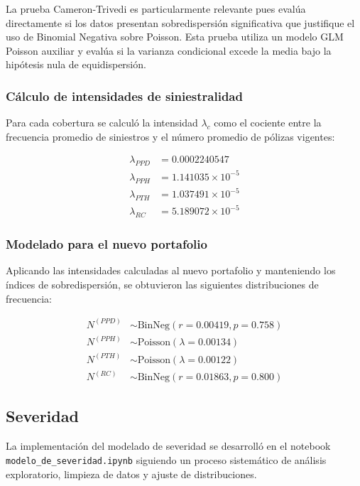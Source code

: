 La prueba Cameron-Trivedi es particularmente relevante pues evalúa directamente si los datos presentan sobredispersión significativa que justifique el uso de Binomial Negativa sobre Poisson. Esta prueba utiliza un modelo GLM Poisson auxiliar y evalúa si la varianza condicional excede la media bajo la hipótesis nula de equidispersión.

\subsubsection{Cálculo de intensidades de siniestralidad}

Para cada cobertura se calculó la intensidad $\lambda_c$ como el cociente entre la frecuencia promedio de siniestros y el número promedio de pólizas vigentes:

\begin{align}
\lambda_{PPD} &= 0.0002240547\\
\lambda_{PPH} &= 1.141035 \times 10^{-5}\\
\lambda_{PTH} &= 1.037491 \times 10^{-5}\\
\lambda_{RC} &= 5.189072 \times 10^{-5}
\end{align}

\subsubsection{Modelado para el nuevo portafolio}

Aplicando las intensidades calculadas al nuevo portafolio y manteniendo los índices de sobredispersión, se obtuvieron las siguientes distribuciones de frecuencia:

\begin{align}
N^{(PPD)} &\sim \text{BinNeg}(r = 0.00419, p = 0.758)\\
N^{(PPH)} &\sim \text{Poisson}(\lambda = 0.00134)\\
N^{(PTH)} &\sim \text{Poisson}(\lambda = 0.00122)\\
N^{(RC)} &\sim \text{BinNeg}(r = 0.01863, p = 0.800)
\end{align}

\subsection{Severidad}

La implementación del modelado de severidad se desarrolló en el notebook \texttt{modelo\_de\_severidad.ipynb} siguiendo un proceso sistemático de análisis exploratorio, limpieza de datos y ajuste de distribuciones.

